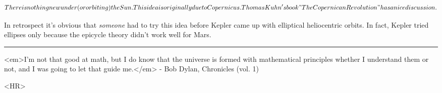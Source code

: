 $$
There is nothing new under (or orbiting) the Sun.  This idea is
originally due to Copernicus.  Thomas Kuhn's book "The Copernican
Revolution" has a nice discussion.
$$
    

In retrospect it's obvious that \emph{someone} had to try this idea
before Kepler came up with elliptical heliocentric orbits. In fact,
Kepler tried ellipses only because the epicycle theory didn't work well 
for Mars.

\par\noindent\rule{\textwidth}{0.4pt}
<em>I'm not that good at math, but I do know that the universe
is formed with mathematical principles whether I understand them
or not, and I was going to let that guide me.</em> - Bob Dylan,
Chronicles (vol. 1)

<HR>



